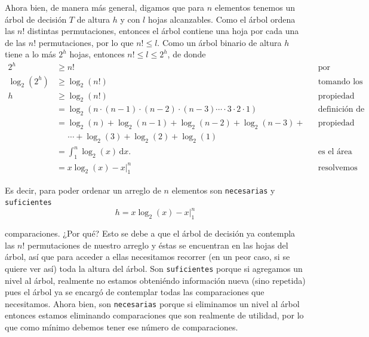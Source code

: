 \documentclass[letterpaper,11pt]{article}
\begin{document}
\begin{enumerate}
    Ahora bien, de manera más general, digamos que para $n$ elementos tenemos 
    un árbol de decisión $T$ de altura $h$ y con $l$ hojas alcanzables. Como el 
    árbol ordena las $n!$ distintas permutaciones, entonces el árbol contiene 
    una hoja por cada una de las $n!$ permutaciones, por lo que $n! \leq l$. 
    Como un árbol binario de altura $h$ tiene a lo más $2^h$ hojas, entonces 
    $n! \leq l \leq 2^h$, de donde 
    \begin{align*}
        2^h &\geq n!
        && \text{por transitividad} \\
        \log_2 (2^h) &\geq \log_2 (n!)
        && \text{tomando los logaritmos} \\
        h &\geq \log_2 (n!)
        && \text{propiedad de logaritmo} \\
        &= \log_2 (n \cdot (n-1) \cdot (n-2) \cdot (n-3) \cdots \cdot 3 \cdot 
        2 \cdot 1)
        && \text{definición de factorial} \\ 
        &= \log_2 (n) + \log_2 (n-1) + \log_2 (n-2) + \log_2 (n-3) +
        && \text{propiedad de logaritmo} \\ 
        & \; \; \; \; \;  \cdots + \log_2 (3) + \log_2 (2) + \log_2 (1) \\
        &= \int_1^n \! \log_2 (x) \, \mathrm{d}x.
        && \text{es el área bajo la curva} \\ 
        &= x \log_2 (x) - x \Big|_1^n
        && \text{resolvemos la integral}
    \end{align*}

    Es decir, para poder ordenar un arreglo de $n$ elementos son 
    \texttt{necesarias} y \texttt{suficientes} 
    \begin{equation*}
        h = x \log_2 (x) - x \Big|_1^n
    \end{equation*}

    comparaciones. ¿Por qué? Esto se debe a que el árbol de decisión ya contempla 
    las $n!$ permutaciones de nuestro arreglo y éstas se encuentran en las hojas 
    del árbol, así que para acceder a ellas necesitamos recorrer (en un peor caso, 
    si se quiere ver así) toda la altura del árbol. Son \texttt{suficientes} porque 
    si agregamos un nivel al árbol, realmente no estamos obteniéndo información 
    nueva (sino repetida) pues el árbol ya se encargó de contemplar todas las 
    comparaciones que necesitamos. Ahora bien, son \texttt{necesarias} porque si 
    eliminamos un nivel al árbol entonces estamos eliminando comparaciones que son 
    realmente de utilidad, por lo que como mínimo debemos tener ese número de 
    comparaciones.


\end{enumerate}
\end{document}
